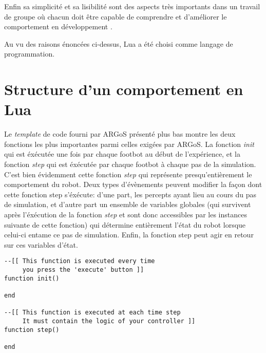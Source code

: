 Enfin sa simplicité et sa lisibilité sont des aspects très importants dans un travail de groupe où chacun doit être capable de comprendre et d'améliorer le comportement en développement \cite{compC++,compLua}.

Au vu des raisons énoncées ci-dessus, Lua a été choisi comme langage de programmation.

\section{Structure d'un comportement en Lua}

Le \emph{template} de code fourni par ARGoS présenté plus bas montre les deux fonctions les plus importantes parmi celles exigées par ARGoS. La fonction \emph{init} qui est éxécutée une fois par chaque footbot au début de l'expérience, et la fonction \emph{step} qui est éxécutée par chaque footbot à chaque pas de la simulation. C'est bien évidemment cette fonction \emph{step} qui représente presqu'entièrement le comportement du robot. Deux types d'évènements peuvent modifier la façon dont cette fonction step s'éxécute: d'une part, les percepts ayant lieu au cours du pas de simulation, et d'autre part un ensemble de variables globales (qui survivent après l'éxécution de la fonction \emph{step} et sont donc accessibles par les instances suivante de cette fonction) qui détermine entièrement l'état du robot lorsque celui-ci entame ce pas de simulation. Enfin, la fonction step peut agir en retour sur ces variables d'état.~\cite{argosSite1}
\begin{lstlisting}[caption=Structure de base d'un comportement en Lua]
--[[ This function is executed every time
     you press the 'execute' button ]]
function init()

end

--[[ This function is executed at each time step
     It must contain the logic of your controller ]]
function step()

end
\end{lstlisting}
